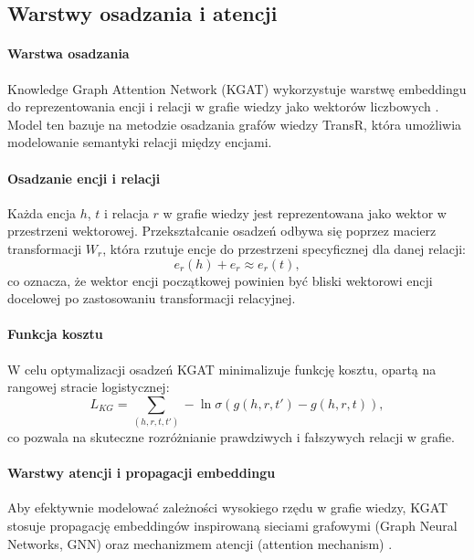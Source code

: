 \documentclass[a4paper,onecolumn]{LTJournalArticle}
\begin{document}
\subsection{Warstwy osadzania i atencji}

\paragraph{Warstwa osadzania} Knowledge Graph Attention Network (KGAT) wykorzystuje warstwę embeddingu do reprezentowania encji i relacji w grafie wiedzy jako wektorów liczbowych \cite{cao2019unifying}. Model ten bazuje na metodzie osadzania grafów wiedzy TransR, która umożliwia modelowanie semantyki relacji między encjami.

\paragraph{Osadzanie encji i relacji} Każda encja \( h \), \( t \) i relacja \cite{cao2018neural} \( r \) w grafie wiedzy jest reprezentowana jako wektor w przestrzeni wektorowej. Przekształcanie osadzeń odbywa się poprzez macierz transformacji \( W_r \), która rzutuje encje do przestrzeni specyficznej dla danej relacji:
\begin{equation}
    e_r(h) + e_r \approx e_r(t),
\end{equation}
co oznacza, że wektor encji początkowej powinien być bliski wektorowi encji docelowej po zastosowaniu transformacji relacyjnej.

\paragraph{Funkcja kosztu} W celu optymalizacji osadzeń KGAT minimalizuje funkcję kosztu, opartą na rangowej stracie logistycznej:
\begin{equation}
    L_{KG} = \sum_{(h,r,t,t')} - \ln \sigma \left( g(h, r, t') - g(h, r, t) \right),
\end{equation}
co pozwala na skuteczne rozróżnianie prawdziwych i fałszywych relacji w grafie.

\paragraph{Warstwy atencji i propagacji embeddingu} Aby efektywnie modelować zależności wysokiego rzędu w grafie wiedzy, KGAT stosuje propagację embeddingów inspirowaną sieciami grafowymi (Graph Neural Networks, GNN) oraz mechanizmem atencji (attention mechanism) \cite{glorot2010understanding}. 
\end{document}
